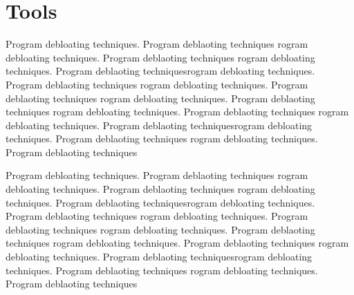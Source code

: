\documentclass{relatorio}
\begin{document}
	\section{Tools}%
\label{Tools}

Program debloating techniques. Program deblaoting techniques rogram debloating techniques. Program deblaoting techniques
rogram debloating techniques. Program deblaoting techniquesrogram debloating techniques. Program deblaoting techniques
rogram debloating techniques. Program deblaoting techniques rogram debloating techniques. Program deblaoting techniques
rogram debloating techniques. Program deblaoting techniques 
rogram debloating techniques. Program deblaoting techniquesrogram debloating techniques. Program deblaoting techniques
rogram debloating techniques. Program deblaoting techniques

Program debloating techniques. Program deblaoting techniques rogram debloating techniques. Program deblaoting techniques
rogram debloating techniques. Program deblaoting techniquesrogram debloating techniques. Program deblaoting techniques
rogram debloating techniques. Program deblaoting techniques rogram debloating techniques. Program deblaoting techniques
rogram debloating techniques. Program deblaoting techniques 
rogram debloating techniques. Program deblaoting techniquesrogram debloating techniques. Program deblaoting techniques
rogram debloating techniques. Program deblaoting techniques
\end{document}
